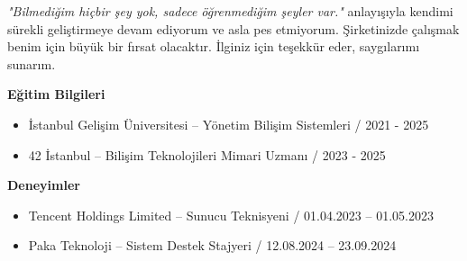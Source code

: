 \documentclass[a4paper,11pt]{article}
\begin{document}
\textit{"Bilmediğim hiçbir şey yok, sadece öğrenmediğim şeyler var."} anlayışıyla kendimi sürekli geliştirmeye devam ediyorum ve asla pes etmiyorum. Şirketinizde çalışmak benim için büyük bir fırsat olacaktır. İlginiz için teşekkür eder, saygılarımı sunarım.

\vspace{0.4em}

\textbf{Eğitim Bilgileri}
\vspace{-0.2em}
\begin{itemize}[leftmargin=2em]
  \item İstanbul Gelişim Üniversitesi – Yönetim Bilişim Sistemleri / 2021 - 2025
  \item 42 İstanbul – Bilişim Teknolojileri Mimari Uzmanı / 2023 - 2025
\end{itemize}

\vspace{-0.1em}

\textbf{Deneyimler}
\vspace{-0.2em}
\begin{itemize}[leftmargin=2em]
  \item Tencent Holdings Limited – Sunucu Teknisyeni / 01.04.2023 – 01.05.2023
  \item Paka Teknoloji – Sistem Destek Stajyeri / 12.08.2024 – 23.09.2024
\end{itemize}

\vspace{0.1em}
\end{document}
